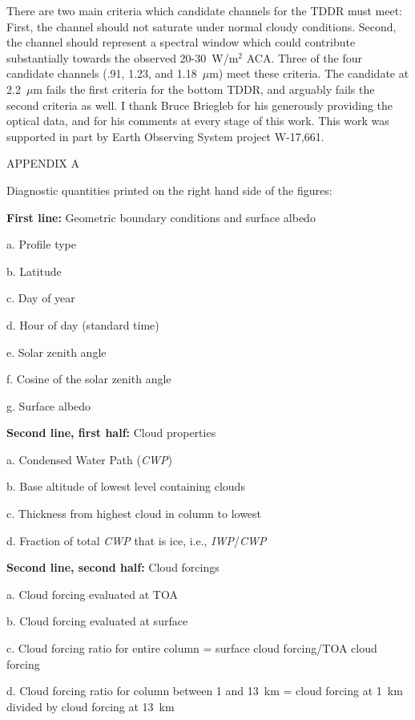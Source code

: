 There are two main criteria which candidate channels for the
TDDR must meet: 
First, the channel should not saturate under normal cloudy
conditions. 
Second, the channel should represent a spectral window which
could contribute substantially towards the observed 20-30~W/m$^2$ ACA.
Three of the four candidate channels (.91, 1.23, and 1.18~$\mu$m) meet
these criteria. 
The candidate at 2.2~$\mu$m fails the first criteria for the bottom
TDDR, and arguably fails the second criteria as well.
\medskip
\baselineskip=14pt
I thank Bruce Briegleb for his generously providing the optical data,
and for his comments at every stage of this work.
This work was supported in part by Earth Observing System project
W-17,661. 
\baselineskip=14pt
%
\vfill\eject

\centerline{APPENDIX A}
\bigskip
Diagnostic quantities printed on the right hand side of the figures:

{\bf First line:} Geometric boundary conditions and surface albedo
\item{a.} Profile type
\item{b.} Latitude
\item{c.} Day of year
\item{d.} Hour of day (standard time)
\item{e.} Solar zenith angle
\item{f.} Cosine of the solar zenith angle
\item{g.} Surface albedo

{\bf Second line, first half:} Cloud properties 
\item{a.} Condensed Water Path ({\it CWP\/})
\item{b.} Base altitude of lowest level containing clouds
\item{c.} Thickness from highest cloud in column to lowest
\item{d.} Fraction of total {\it CWP\/} that is ice, i.e., {\it IWP}/{\it CWP}

{\bf Second line, second half:} Cloud forcings
\item{a.} Cloud forcing evaluated at TOA
\item{b.} Cloud forcing evaluated at surface
\item{c.} Cloud forcing ratio for entire column = surface cloud forcing/TOA cloud forcing
\item{d.} Cloud forcing ratio for column between 1 and 13~km = cloud
forcing at 1~km divided by cloud forcing at 13~km

